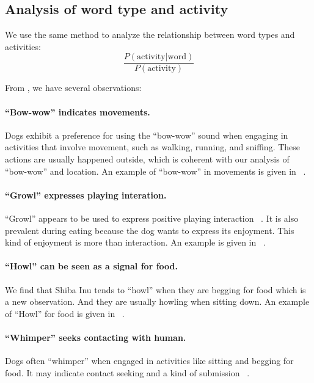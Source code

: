 \subsection{Analysis of word type and activity}
We use the same method to analyze the relationship between word types and 
activities: 
\begin{equation}
\frac{P (\text{activity}| \text{word})}{P(\text{activity})}
\end{equation}

From , we have several observations:
\paragraph{``Bow-wow'' indicates movements.} Dogs exhibit a preference for using the ``bow-wow'' sound when engaging in activities that involve movement, such as walking, running, and sniffing. These actions are usually happened outside, which is coherent with our analysis of ``bow-wow'' and location. An example of ``bow-wow'' in movements is given in ~.

\paragraph{``Growl'' expresses playing interation.}
``Growl'' appears to be used to express positive playing interaction ~\cite{handelman2012canine}. It is also prevalent during eating because the dog wants to express its enjoyment. This kind of enjoyment is more than interaction. An example is given in ~.


\paragraph{``Howl'' can be seen as a signal for food.}
We find that Shiba Inu tends to ``howl'' when they are begging for food which is a new observation. And they are usually howling when sitting down. An example of ``Howl'' for food is given in ~.




\paragraph{``Whimper'' seeks contacting with human.}
Dogs often ``whimper'' when engaged in activities like sitting and begging for food. It may indicate contact seeking and a kind of submission ~\cite{pongracz2010barking}. 




